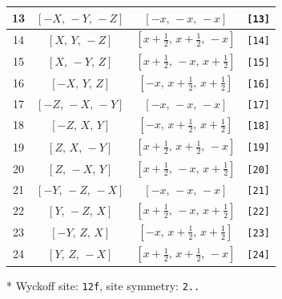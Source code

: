 \documentclass[fleqn,8pt]{jsarticle}
\begin{document}
\begin{longtable}{cccc}
13 & $\left[ - X,\, - Y,\, - Z \right]$ & $\left[ - x,\, - x,\, - x \right]$ & {\tt [13]} \\ \hline
14 & $\left[ X,\, Y,\, - Z \right]$ & $\left[ x + \frac{1}{2},\, x + \frac{1}{2},\, - x \right]$ & {\tt [14]} \\ \hline
15 & $\left[ X,\, - Y,\, Z \right]$ & $\left[ x + \frac{1}{2},\, - x,\, x + \frac{1}{2} \right]$ & {\tt [15]} \\ \hline
16 & $\left[ - X,\, Y,\, Z \right]$ & $\left[ - x,\, x + \frac{1}{2},\, x + \frac{1}{2} \right]$ & {\tt [16]} \\ \hline
17 & $\left[ - Z,\, - X,\, - Y \right]$ & $\left[ - x,\, - x,\, - x \right]$ & {\tt [17]} \\ \hline
18 & $\left[ - Z,\, X,\, Y \right]$ & $\left[ - x,\, x + \frac{1}{2},\, x + \frac{1}{2} \right]$ & {\tt [18]} \\ \hline
19 & $\left[ Z,\, X,\, - Y \right]$ & $\left[ x + \frac{1}{2},\, x + \frac{1}{2},\, - x \right]$ & {\tt [19]} \\ \hline
20 & $\left[ Z,\, - X,\, Y \right]$ & $\left[ x + \frac{1}{2},\, - x,\, x + \frac{1}{2} \right]$ & {\tt [20]} \\ \hline
21 & $\left[ - Y,\, - Z,\, - X \right]$ & $\left[ - x,\, - x,\, - x \right]$ & {\tt [21]} \\ \hline
22 & $\left[ Y,\, - Z,\, X \right]$ & $\left[ x + \frac{1}{2},\, - x,\, x + \frac{1}{2} \right]$ & {\tt [22]} \\ \hline
23 & $\left[ - Y,\, Z,\, X \right]$ & $\left[ - x,\, x + \frac{1}{2},\, x + \frac{1}{2} \right]$ & {\tt [23]} \\ \hline
24 & $\left[ Y,\, Z,\, - X \right]$ & $\left[ x + \frac{1}{2},\, x + \frac{1}{2},\, - x \right]$ & {\tt [24]} \\
\end{longtable}
* Wyckoff site: {\tt 12f}, site symmetry: {\tt 2..}
\renewcommand{\arraystretch}{1.2}
\end{document}
